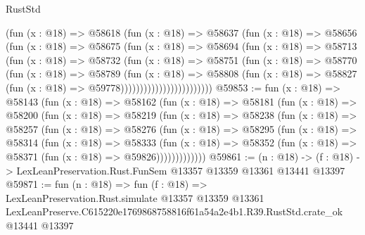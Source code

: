 \begin{lexlean}{RustStd}
\begin{coremodule}
                          (fun (x : @18) =>
                          @58618
                            (fun (x : @18) =>
                            @58637
                              (fun (x : @18) =>
                              @58656
                                (fun (x : @18) =>
                                @58675
                                  (fun (x : @18) =>
                                  @58694
                                    (fun (x : @18) =>
                                    @58713
                                      (fun (x : @18) =>
                                      @58732
                                        (fun (x : @18) =>
                                        @58751
                                          (fun (x : @18) =>
                                          @58770
                                            (fun (x : @18) =>
                                            @58789
                                              (fun (x : @18) =>
                                              @58808
                                                (fun (x : @18) =>
                                                @58827
                                                  (fun (x : @18) => @59778))))))))))))))))))))))))
@59853 := fun (x : @18) =>
  @58143
    (fun (x : @18) =>
    @58162
      (fun (x : @18) =>
      @58181
        (fun (x : @18) =>
        @58200
          (fun (x : @18) =>
          @58219
            (fun (x : @18) =>
            @58238
              (fun (x : @18) =>
              @58257
                (fun (x : @18) =>
                @58276
                  (fun (x : @18) =>
                  @58295
                    (fun (x : @18) =>
                    @58314
                      (fun (x : @18) =>
                      @58333
                        (fun (x : @18) =>
                        @58352 (fun (x : @18) => @58371 (fun (x : @18) => @59826)))))))))))))
@59861 := (n : @18) ->
  (f : @18) -> LexLeanPreservation.Rust.FunSem @13357 @13359 @13361 @13441 @13397
@59871 := fun (n : @18) =>
  fun (f : @18) =>
  LexLeanPreservation.Rust.simulate
    @13357
    @13359
    @13361
    LexLeanPreserve.C615220e1769868758816f61a54a2e4b1.R39.RustStd.crate_ok
    @13441
    @13397
\end{coremodule}
\end{lexlean}
